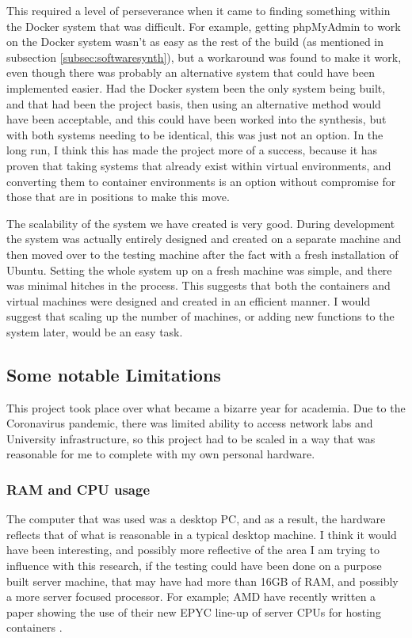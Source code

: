 This required a level of perseverance when it came to finding something within the Docker system that was difficult. For example, getting phpMyAdmin to work on the Docker system wasn't as easy as the rest of the build (as mentioned in subsection \ref{subsec:softwaresynth}), but a workaround was found to make it work, even though there was probably an alternative system that could have been implemented easier. Had the Docker system been the only system being built, and that had been the project basis, then using an alternative method would have been acceptable, and this could have been worked into the synthesis, but with both systems needing to be identical, this was just not an option. In the long run, I think this has made the project more of a success, because it has proven that taking systems that already exist within virtual environments, and converting them to container environments is an option without compromise for those that are in positions to make this move.

The scalability of the system we have created is very good. During development the system was actually entirely designed and created on a separate machine and then moved over to the testing machine after the fact with a fresh installation of Ubuntu. Setting the whole system up on a fresh machine was simple, and there was minimal hitches in the process. This suggests that both the containers and virtual machines were designed and created in an efficient manner. I would suggest that scaling up the number of machines, or adding new functions to the system later, would be an easy task.

\subsection{Some notable Limitations}%
\label{HardwareLimitations}
This project took place over what became a bizarre year for academia. Due to the Coronavirus pandemic, there was limited ability to access network labs and University infrastructure, so this project had to be scaled in a way that was reasonable for me to complete with my own personal hardware.

\subsubsection{RAM and CPU usage}
\label{RAMCPU}
The computer that was used was a desktop PC, and as a result, the hardware reflects that of what is reasonable in a typical desktop machine. I think it would have been interesting, and possibly more reflective of the area I am trying to influence with this research, if the testing could have been done on a purpose built server machine, that may have had more than 16GB of RAM, and possibly a more server focused processor. For example; AMD have recently written a paper showing the use of their new EPYC line-up of server CPUs for hosting containers \citep{amdcontainers}.

